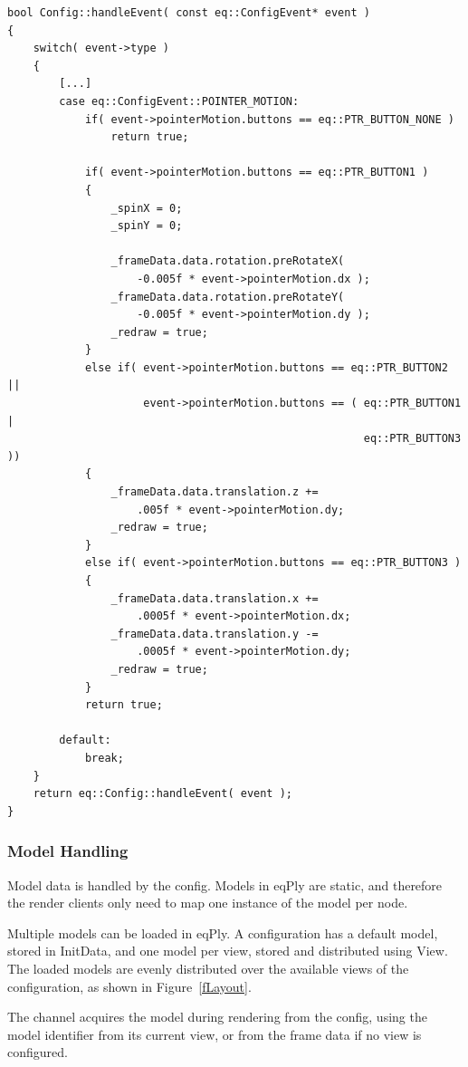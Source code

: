 \documentclass[10pt,a4]{scrartcl}
\newcommand{\fig}[1]{Figure~\ref{#1}}
\begin{document}
{\footnotesize\begin{lstlisting}
bool Config::handleEvent( const eq::ConfigEvent* event )
{
    switch( event->type )
    {
        [...]
        case eq::ConfigEvent::POINTER_MOTION:
            if( event->pointerMotion.buttons == eq::PTR_BUTTON_NONE )
                return true;

            if( event->pointerMotion.buttons == eq::PTR_BUTTON1 )
            {
                _spinX = 0;
                _spinY = 0;

                _frameData.data.rotation.preRotateX( 
                    -0.005f * event->pointerMotion.dx );
                _frameData.data.rotation.preRotateY(
                    -0.005f * event->pointerMotion.dy );
                _redraw = true;
            }
            else if( event->pointerMotion.buttons == eq::PTR_BUTTON2 ||
                     event->pointerMotion.buttons == ( eq::PTR_BUTTON1 |
                                                       eq::PTR_BUTTON3 ))
            {
                _frameData.data.translation.z +=
                    .005f * event->pointerMotion.dy;
                _redraw = true;
            }
            else if( event->pointerMotion.buttons == eq::PTR_BUTTON3 )
            {
                _frameData.data.translation.x += 
                    .0005f * event->pointerMotion.dx;
                _frameData.data.translation.y -= 
                    .0005f * event->pointerMotion.dy;
                _redraw = true;
            }
            return true;
            
        default:
            break;
    }
    return eq::Config::handleEvent( event );
}
\end{lstlisting}}

\subsubsection{Model Handling}

Model data is handled by the config. Models in eqPly are static,
and therefore the render clients only need to map one instance of the
model per node.

Multiple models can be loaded in \textsf{eqPly}. A configuration has a
default model, stored in \textsf{InitData}, and one model per view,
stored and distributed using \textsf{View}. The
loaded models are evenly distributed over the available views of the
configuration, as shown in \fig{fLayout}.

The channel acquires the model during rendering from the config, using
the model identifier from its current view, or from the frame data if
no view is configured.
\end{document}
